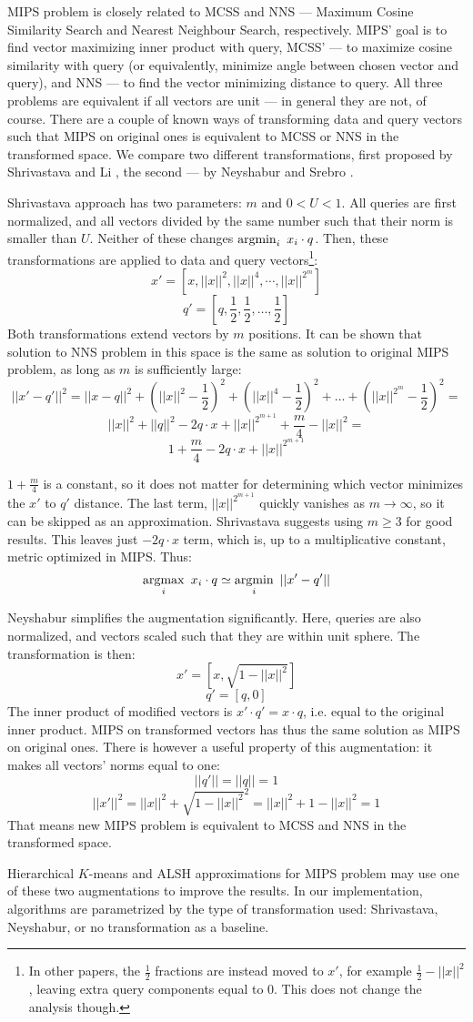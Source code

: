 MIPS problem is closely related to MCSS and NNS --- Maximum Cosine
Similarity Search and Nearest Neighbour Search, respectively.
MIPS' goal is to find vector maximizing inner product with query,
MCSS' --- to maximize cosine similarity with query (or equivalently,
minimize angle between chosen vector and query), and NNS --- to find
the vector minimizing distance to query. All three problems are
equivalent if all vectors are unit --- in general they are not, of course.
There are a couple of known ways
of transforming data and query vectors such that MIPS on original ones
is equivalent to MCSS or NNS in the transformed space. We compare two different
transformations, first proposed by Shrivastava and Li \cite{alsh}, the second --- by
Neyshabur and Srebro \cite{neyshabur}.

Shrivastava approach has two parameters: $m$ and $0 < U < 1$. All queries
are first normalized, and all vectors divided by the same number such that
their norm is smaller than $U$. Neither of these changes
$ \operatorname*{argmin}_{i}\ x_i \cdot q$. Then, these transformations are applied to data
and query vectors\footnote{In other papers, the $\frac{1}{2}$ fractions are
instead moved to $x'$, for example $\frac{1}{2} - ||x||^2$, leaving extra
query components equal to 0. This does not change the analysis though.}:
$$
x' = [x, ||x||^2, ||x||^4, \cdots, ||x||^{2^m}]
$$
$$
q' = [q, \frac{1}{2}, \frac{1}{2}, \dots, \frac{1}{2}]
$$
Both transformations extend vectors by $m$ positions. It can be shown that
solution to NNS problem in this space is the same as solution to original
MIPS problem, as long as $m$ is sufficiently large:
$$
||x' - q'||^2 = ||x - q||^2 +
(||x||^2 - \frac{1}{2})^2 + (||x||^4 - \frac{1}{2})^2 + \dots + 
(||x||^{2^m} - \frac{1}{2})^2 =
$$
$$
||x||^2 + ||q||^2 - 2 q \cdot x
+ ||x||^{2^{m+1}} + \frac{m}{4} - ||x||^2 =
$$
$$
1 + \frac{m}{4} - 2 q \cdot x + ||x||^{2^{m+1}}
$$

$ 1 + \frac{m}{4} $ is a constant, so it does not matter for determining 
which vector minimizes the $x'$ to $q'$ distance. The last term, 
$||x||^{2^{m+1}}$ quickly vanishes as $m \to \infty$, so it can be skipped
as an approximation. Shrivastava suggests using $m \ge 3$ for good results.
This leaves just $ - 2 q \cdot x $ term, which is, up to a multiplicative
constant, metric optimized in MIPS.
Thus:
$$
\operatorname*{argmax}_{i}\ x_i \cdot q \simeq \operatorname*{argmin}_{i}\ ||x' - q'||
$$

Neyshabur simplifies the augmentation significantly. Here, queries are also
normalized, and vectors scaled such that they are within unit sphere. The
transformation is then:
$$
x' = [x, \sqrt{1 - ||x||^2}]
$$
$$
q' = [q, 0]
$$
The inner product of modified vectors is $x' \cdot q' = x \cdot q$, i.e. equal
to the original inner product. MIPS on transformed vectors has thus the same
solution as MIPS on original ones. There is however a useful property of this
augmentation: it makes all vectors' norms equal to one: 
$$ ||q'|| = ||q|| = 1 $$
$$ ||x'||^2 = ||x||^2 + \sqrt{1 - ||x||^2}^2 = ||x||^2 + 1 - ||x||^2 = 1 $$
That means new MIPS problem is equivalent to MCSS and NNS in the transformed
space.

Hierarchical $K$-means and ALSH approximations for MIPS problem may use one
of these two augmentations to improve the results. In our implementation,
algorithms are parametrized by the type of transformation used: Shrivastava,
Neyshabur, or no transformation as a baseline.
